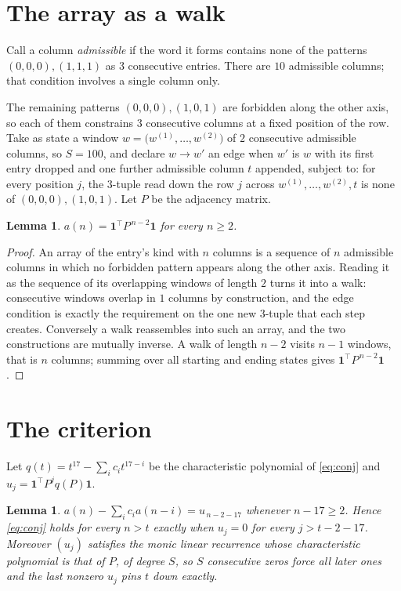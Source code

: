 \documentclass[11pt,a4paper]{article}
\theoremstyle{plain}
\newtheorem{lemma}[theorem]{Lemma}
\theoremstyle{definition}
\begin{document}
\section{The array as a walk}

Call a column \emph{admissible} if the word it forms contains none of the patterns
$(0,0,0), (1,1,1)$ as $3$ consecutive entries. There are $10$ admissible columns; that condition
involves a single column only.

The remaining patterns $(0,0,0), (1,0,1)$ are forbidden along the other axis, so each of them
constrains $3$ consecutive columns at a fixed position of the row. Take as state a
window $w=\bigl(w^{(1)},\dots,w^{(2)}\bigr)$ of $2$ consecutive admissible
columns, so $S=100$, and declare $w\to w'$ an edge when $w'$ is $w$ with its first entry
dropped and one further admissible column $t$ appended, subject to: for every position
$j$, the $3$-tuple read down the row $j$ across $w^{(1)},\dots,w^{(2)},t$
is none of $(0,0,0), (1,0,1)$. Let $P$ be the adjacency matrix.

\begin{lemma}\label{lem:walk}
$a(n)=\mathbf{1}^{\!\top}P^{\,n-2}\mathbf{1}$ for every $n\ge2$.
\end{lemma}

\begin{proof}
An array of the entry's kind with $n$ columns is a sequence of $n$ admissible columns in
which no forbidden pattern appears along the other axis. Reading it as the sequence of its
overlapping windows of length $2$ turns it into a walk: consecutive windows overlap in
$1$ columns by construction, and the edge condition is exactly the requirement on the one
new $3$-tuple that each step creates. Conversely a walk reassembles into such an array,
and the two constructions are mutually inverse. A walk of length $n-2$ visits $n-1$
windows, that is $n$ columns; summing over all starting and ending states gives
$\mathbf{1}^{\!\top}P^{\,n-2}\mathbf{1}$.
\end{proof}

\section{The criterion}

Let $q(t)=t^{17}-\sum_i c_i t^{17-i}$ be the characteristic polynomial of
\eqref{eq:conj} and $u_j=\mathbf{1}^{\!\top}P^{j}q(P)\mathbf{1}$.

\begin{lemma}\label{lem:crit}
$a(n)-\sum_i c_i a(n-i)=u_{\,n-2-17}$ whenever $n-17\ge2$. Hence
\eqref{eq:conj} holds for every $n>t$ exactly when $u_j=0$ for every
$j>t-2-17$. Moreover $(u_j)$ satisfies the monic linear recurrence whose
characteristic polynomial is that of $P$, of degree $S$, so $S$ consecutive zeros force all
later ones and the last nonzero $u_j$ pins $t$ down exactly.
\end{lemma}
\end{document}
